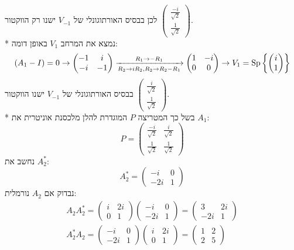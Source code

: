 לכן בבסיס האורתוגונלי של $V_{-1}$ ישנו רק הווקטור $\begin{pmatrix} \frac{-i}{\sqrt{2}} \\ \frac{1}{\sqrt{2}} \end{pmatrix}$. \\*
נמצא את המרחב $V_1$ באופן דומה:
\[
	(A_1 - I) = 0
	\rightarrow
	\begin{pmatrix}
		-1 & i \\
		-i & -1
	\end{pmatrix}
	\xrightarrow[R_2 \to i R_2, R_2 \to R_2 - R_1]{R_1 \to -R_1}
	\begin{pmatrix}
		1 & -i \\
		0 & 0
	\end{pmatrix}
	\rightarrow
	V_1 = \operatorname{Sp}\left\{ \begin{pmatrix} i \\ 1 \end{pmatrix}\right\}
\]
בבסיס האורתוגונלי של $V_{-1}$ ישנו הווקטור $\begin{pmatrix} \frac{i}{\sqrt{2}} \\ \frac{1}{\sqrt{2}} \end{pmatrix}$. \\*
בשל כך המטריצה $P$ המוגדרת להלן מלכסנת אוניטרית את $A_1$:
\[
	P = \begin{pmatrix}
		\frac{-i}{\sqrt{2}} & \frac{i}{\sqrt{2}} \\
		\frac{1}{\sqrt{2}} & \frac{1}{\sqrt{2}}
	\end{pmatrix}
\]
נחשב את $A_2^*$:
\[
	A_2^* = \begin{pmatrix}
		-i & 0 \\
		-2i & 1
	\end{pmatrix}
\]
נבדוק אם $A_2$ נורמלית:
\begin{align*}
	A_2 A_2^* = 
	\begin{pmatrix}
		i & 2i \\
		0 & 1
	\end{pmatrix} \begin{pmatrix}
		-i & 0 \\
		-2i & 1
	\end{pmatrix}
	= \begin{pmatrix}
		3 & 2i \\
		-2i & 1
	\end{pmatrix} \\
	A_2^* A_2 = 
	\begin{pmatrix}
		-i & 0 \\
		-2i & 1
	\end{pmatrix}
	\begin{pmatrix}
		i & 2i \\
		0 & 1
	\end{pmatrix}
	= \begin{pmatrix}
		1 & 2 \\
		2 & 5
	\end{pmatrix} \\
\end{align*}
